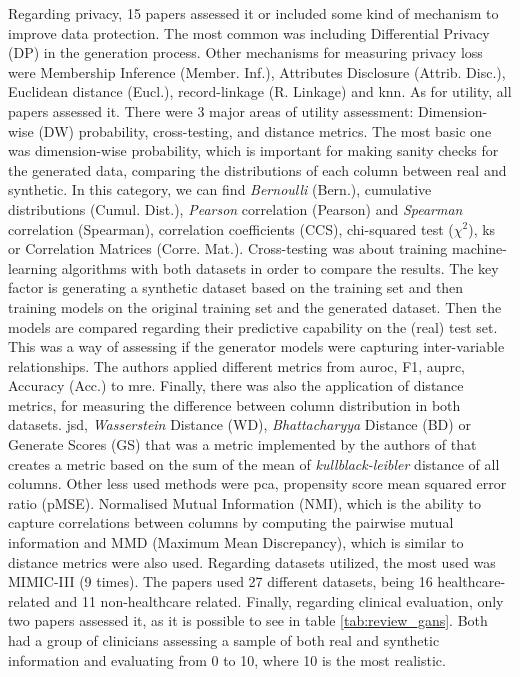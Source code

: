 Regarding privacy, 15 papers assessed it or included some kind of mechanism to improve data protection. The most common was including Differential Privacy (DP) in the generation process. Other mechanisms for measuring privacy loss were Membership Inference (Member. Inf.), Attributes Disclosure (Attrib. Disc.), Euclidean distance (Eucl.), record-linkage (R. Linkage) and \acf{knn}.
As for utility, all papers assessed it. There were 3 major areas of utility assessment: Dimension-wise (DW) probability, cross-testing, and distance metrics. The most basic one was dimension-wise probability, which is important for making sanity checks for the generated data, comparing the distributions of each column between real and synthetic. In this category, we can find \textit{Bernoulli} (Bern.), cumulative distributions (Cumul. Dist.), \textit{Pearson} correlation (Pearson) and \textit{Spearman} correlation (Spearman), correlation coefficients (CCS), chi-squared test ($\chi^{2}$),  \acf{ks} or Correlation Matrices (Corre. Mat.).
Cross-testing was about training machine-learning algorithms with both datasets in order to compare the results. The key factor is generating a synthetic dataset based on the training set and then training models on the original training set and the generated dataset. Then the models are compared regarding their predictive capability on the (real) test set. This was a way of assessing if the generator models were capturing inter-variable relationships. The authors applied different metrics from \acf{auroc}, F1, \ac{auprc}, Accuracy (Acc.) to \acf{mre}. Finally, there was also the application of distance metrics, for measuring the difference between column distribution in both datasets. \acf{jsd}, \textit{Wasserstein} Distance (WD), \textit{Bhattacharyya} Distance (BD) or Generate Scores (GS) that was a metric implemented by the authors of \cite{liu_ppgan_2019} that creates a metric based on the sum of the mean of \textit{kullblack-leibler}  distance of all columns. Other less used methods were \acf{pca}, propensity score mean squared error ratio (pMSE). Normalised Mutual Information (NMI), which is the ability to capture correlations between columns by computing the pairwise mutual information and MMD (Maximum Mean Discrepancy), which is similar to distance metrics were also used. Regarding datasets utilized, the most used was MIMIC-III \cite{mimiciii} (9 times). The papers used 27 different datasets, being 16 healthcare-related and 11 non-healthcare related. 
Finally, regarding clinical evaluation, only two papers assessed it, as it is possible to see in table \ref{tab:review_gans}. Both had a group of clinicians assessing a sample of both real and synthetic information and evaluating from 0 to 10, where 10 is the most realistic.
